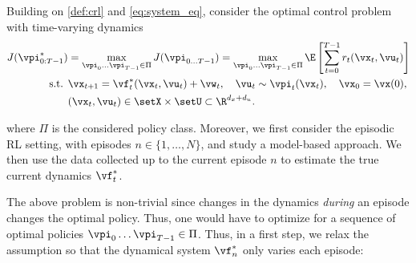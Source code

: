 \begin{problem}
\label{pr:finite_horizon_problem}
Building on \cref{def:crl} and \cref{eq:system_eq}, consider the optimal control problem with time-varying dynamics
\begin{align}
    J(\vpi^*_{0:T-1})&=\max_{\vpi_0\ldots\vpi_{T-1} \in \Pi} J(\vpi_{0\ldots T-1}) = \max_{\vpi_0\ldots\vpi_{T-1} \in \Pi} \E\left[\sum_{t=0}^{T-1} r_t(\vx_t, \vu_t)\right] \label{eq:finite_horizon_problem}\\
    \textrm{s.t. }&\vx_{t+1} = \vf^*_t(\vx_{t}, \vu_{t}) + \vw_t, \quad \vu_t \sim \vpi_t(\vx_t),\quad \vx_0 = \vx(0), \notag \\
    & (\vx_t, \vu_t) \in \setX \times \setU \subset \R^{d_x+d_u}.\notag
\end{align}
\end{problem}
where $\Pi$ is the considered policy class. Moreover, we first consider the episodic RL setting, with episodes $n \in \{1, \ldots, N\}$, and study a model-based approach.
We then use the data collected up to the current episode $n$ to estimate the true current dynamics $\vf^*_t$.

The above problem is non-trivial since changes in the dynamics \textit{during} an episode changes the optimal policy. Thus, one would have to optimize for a sequence of optimal policies $\vpi_0\ldots\vpi_{T-1} \in \Pi$. Thus, in a first step, we relax the assumption so that the dynamical system $\vf^*_n$ only varies each episode:


